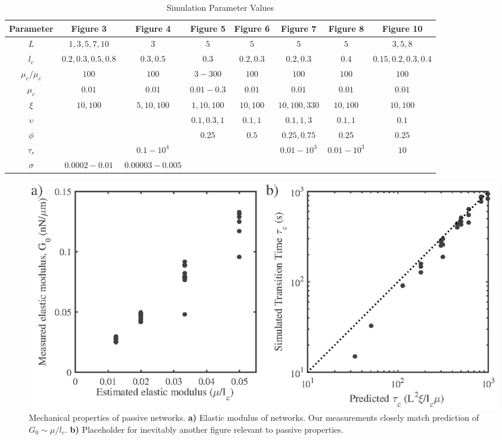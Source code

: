 
\begin{table}[h]
\centering
\caption{Simulation Parameter Values}
\label{table:para2}
\begin{tabular}{|c|ccccccc|}
	\hline
	Parameter     & \textbf{Figure 3}          & \textbf{Figure 4}       & \textbf{Figure 5}    & \textbf{Figure 6}  & \textbf{Figure 7}     & \textbf{Figure 8}    & \textbf{Figure 10}          \\ \hline
	$L$           & $1,3,5,7,10$      & $3$             & $5$         & $5$       & $5$          & $5$         & $3,5,8$            \\ 
	$l_c$         & $0.2,0.3,0.5,0.8$ & $0.3,0.5$       & $0.3$       & $0.2,0.3$ & $0.2,0.3$    & $0.4$       & $0.15,0.2,0.3,0.4$ \\ 
	$\mu_e/\mu_c$ & $100$             & $100$           & $3-300$     & $100$     & $100$        & $100$       & $100$              \\ 
	$\mu_c$       & $0.01$            & $0.01$          & $0.01-0.3$  & $0.01$    & $0.01$       & $0.01$      & $0.01$             \\ 
	$\xi$         & $10,100$          & $5,10,100$      & $1,10,100$  & $10,100$  & $10,100,330$ & $10,100$    & $10,100$           \\ 
	$\upsilon$    & ~                 & ~               & $0.1,0.3,1$ & $0.1,1$   & $0.1,1,3$    & $0.1,1$     & $0.1$              \\ 
	$\phi$        & ~                 & ~               & $0.25$      & $0.5$     & $0.25,0.75$  & $0.25$      & $0.25$             \\ 
	$\tau_r$      & ~                 & $0.1-10^4$      & ~           & ~         & $0.01-10^3$  & $0.01-10^3$ & $10$               \\ 
	$\sigma$      & $0.0002-0.01$     & $0.00003-0.005$ & ~           & ~         & ~            & ~           & ~                  \\
	\hline
\end{tabular}
\end{table}


\begin{figure}[h!]
\centering
\includegraphics[width=\hsize]{active/figures/figure3S}
\caption{\label{fig:passive_supp}  Mechanical properties of passive networks.  \textbf{a)} Elastic modulus of networks.  Our measurements closely match prediction of $G_0\sim\mu/l_c$.  \textbf{b)}  Placeholder for inevitably another figure relevant to passive properties.}
\end{figure}


